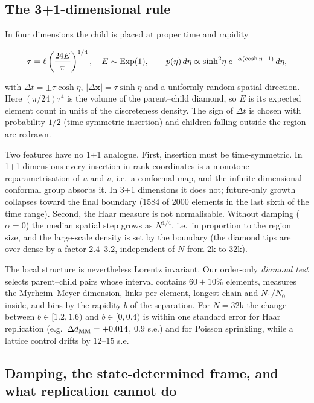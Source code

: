 \hypertarget{the-31-dimensional-rule}{%
\subsection{The 3+1-dimensional
rule}\label{the-31-dimensional-rule}}

In four dimensions the child is placed at proper time and
rapidity

\[\tau=\ell\left(\frac{24E}{\pi}\right)^{1/4},\quad E\sim{\rm Exp}(1),\qquad p(\eta)\,d\eta\propto\sinh^2\!\eta\;e^{-\alpha(\cosh\eta-1)}\,d\eta ,\]

with \(\Delta t=\pm\tau\cosh\eta\),
\(|\Delta\mathbf{x}|=\tau\sinh\eta\) and a uniformly random
spatial direction. Here \((\pi/24)\tau^4\) is the volume of
the parent--child diamond, so \(E\) is its expected element
count in units of the discreteness density. The sign of
\(\Delta t\) is chosen with probability \(1/2\)
(time-symmetric insertion) and children falling outside the
region are redrawn.

Two features have no 1+1 analogue. First, insertion must be
time-symmetric. In 1+1 dimensions every insertion in rank
coordinates is a monotone reparametrisation of \(u\) and
\(v\), i.e.~a conformal map, and the infinite-dimensional
conformal group absorbs it. In 3+1 dimensions it does not;
future-only growth collapses toward the final boundary (1584
of 2000 elements in the last sixth of the time range).
Second, the Haar measure is not normalisable. Without
damping (\(\alpha=0\)) the median spatial step grows as
\(N^{1/4}\), i.e.~in proportion to the region size, and the
large-scale density is set by the boundary (the diamond tips
are over-dense by a factor \(2.4\)--\(3.2\), independent of
\(N\) from 2k to 32k).

The local structure is nevertheless Lorentz invariant. Our
order-only \emph{diamond test} selects parent--child pairs
whose interval contains \(60\pm10\%\) elements, measures the
Myrheim--Meyer dimension, links per element, longest chain
and \(N_1/N_0\) inside, and bins by the rapidity \(b\) of
the separation. For \(N=32\)k the change between
\(b\in[1.2,1.6)\) and \(b\in[0,0.4)\) is within one standard
error for Haar replication
(e.g.~\(\Delta d_{\rm MM}=+0.014\), \(0.9\) s.e.) and for
Poisson sprinkling, while a lattice control drifts by
\(12\)--\(15\) s.e.

\hypertarget{damping-the-state-determined-frame-and-what-replication-cannot-do}{%
\subsection{Damping, the state-determined frame, and what
replication cannot
do}\label{damping-the-state-determined-frame-and-what-replication-cannot-do}}

